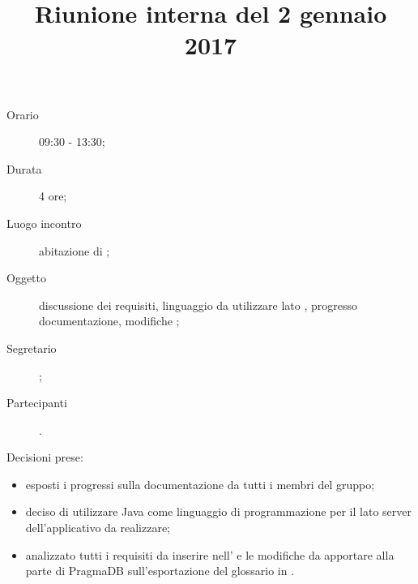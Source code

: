 


\author{\PB}
\supervisor{\MM}
\title{Riunione interna del 2 gennaio 2017}



\maketitle

\begin{description}
	\item[Orario] 09:30 - 13:30;
	\item[Durata] 4 ore;
	\item[Luogo incontro] abitazione di \PB;
	\item[Oggetto] discussione dei requisiti, linguaggio da utilizzare lato , progresso documentazione, modifiche ;
	\item[Segretario] \PB; 
	\item[Partecipanti] \ALL.
\end{description}
Decisioni prese:
\begin{itemize}
\item esposti i progressi sulla documentazione da tutti i membri del gruppo;
\item deciso di utilizzare Java come linguaggio di programmazione per il lato server dell'applicativo da realizzare;
\item analizzato tutti i requisiti da inserire nell'\AdR{} e le modifiche da apportare alla parte  di PragmaDB sull'esportazione del glossario in .
\end{itemize}


